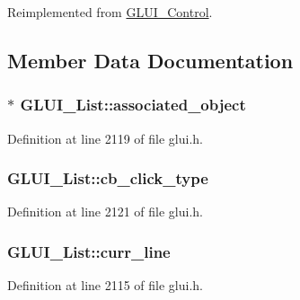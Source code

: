 Reimplemented from \hyperlink{class_g_l_u_i___control_a4bfe55acbbf735a7d2ff07d687a481e2}{G\+L\+U\+I\+\_\+\+Control}.



\subsection{Member Data Documentation}
\hypertarget{class_g_l_u_i___list_a1c3da23655fb3019ecf7836782c6a0c6}{
\subsubsection[{associated\+\_\+object}]{$\ast$ G\+L\+U\+I\+\_\+\+List\+::associated\+\_\+object}}\label{class_g_l_u_i___list_a1c3da23655fb3019ecf7836782c6a0c6}


Definition at line 2119 of file glui.\+h.

\hypertarget{class_g_l_u_i___list_a10035be2d469c11e4009e77540bdf080}{
\subsubsection[{cb\+\_\+click\+\_\+type}]{ G\+L\+U\+I\+\_\+\+List\+::cb\+\_\+click\+\_\+type}}\label{class_g_l_u_i___list_a10035be2d469c11e4009e77540bdf080}


Definition at line 2121 of file glui.\+h.

\hypertarget{class_g_l_u_i___list_ab679e49f81d8c137d2511eb42bed52f4}{
\subsubsection[{curr\+\_\+line}]{ G\+L\+U\+I\+\_\+\+List\+::curr\+\_\+line}}\label{class_g_l_u_i___list_ab679e49f81d8c137d2511eb42bed52f4}


Definition at line 2115 of file glui.\+h.

